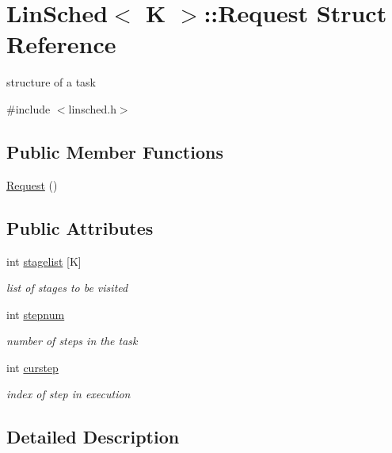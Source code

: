 \hypertarget{structLinSched_1_1Request}{\section{Lin\-Sched$<$ K $>$\-:\-:Request Struct Reference}
\label{structLinSched_1_1Request}
}


structure of a task  




{\ttfamily \#include $<$linsched.\-h$>$}

\subsection*{Public Member Functions}
\begin{DoxyCompactItemize}
\item 
\hyperlink{structLinSched_1_1Request_a462c845c66141798edf4ffb9589258ce}{Request} ()
\end{DoxyCompactItemize}
\subsection*{Public Attributes}
\begin{DoxyCompactItemize}
\item 
int \hyperlink{structLinSched_1_1Request_a52caca2593fe99f1fb8dcc8936df33bb}{stagelist} \mbox{[}K\mbox{]}
\begin{DoxyCompactList}\small\item\em list of stages to be visited \end{DoxyCompactList}\item 
int \hyperlink{structLinSched_1_1Request_adc40fd35ddf3fceee69c0cd130f76116}{stepnum}
\begin{DoxyCompactList}\small\item\em number of steps in the task \end{DoxyCompactList}\item 
int \hyperlink{structLinSched_1_1Request_ab19432f12470f61d6a77560716bb38af}{curstep}
\begin{DoxyCompactList}\small\item\em index of step in execution \end{DoxyCompactList}\end{DoxyCompactItemize}


\subsection{Detailed Description}
